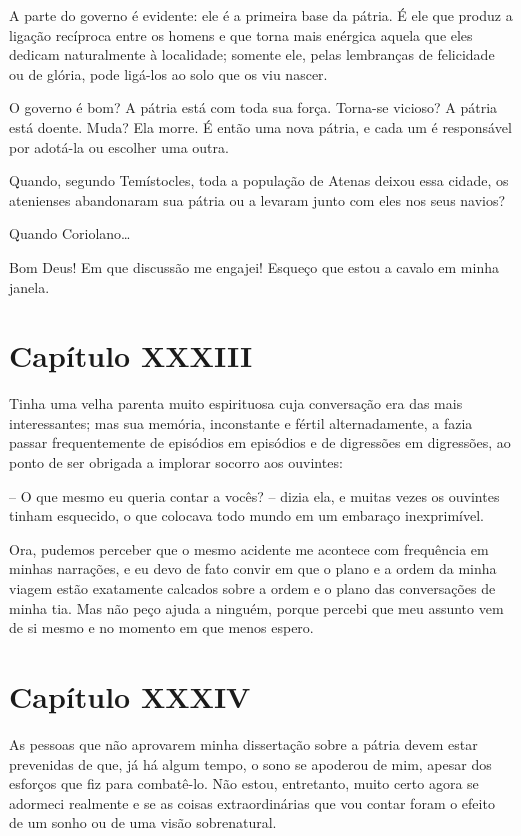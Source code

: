  A parte do governo é evidente: ele é a primeira base da pátria. É ele
que produz a ligação recíproca entre os homens e que torna mais
enérgica aquela que eles dedicam naturalmente à localidade; somente
ele, pelas lembranças de felicidade ou de glória, pode ligá-los ao solo
que os viu nascer.

 O governo é bom? A pátria está com toda sua força. Torna-se vicioso? A
pátria está doente. Muda? Ela morre. É então uma nova pátria, e cada um
é responsável por adotá-la ou escolher uma outra.

 Quando, segundo Temístocles, toda a população de Atenas deixou essa
cidade, os atenienses abandonaram sua pátria ou a levaram junto com
eles nos seus navios?

 Quando Coriolano\ldots

 Bom Deus! Em que discussão me engajei! Esqueço que estou a cavalo em
minha janela.

\section{Capítulo XXXIII}

 Tinha uma velha parenta muito espirituosa cuja conversação era das mais
interessantes; mas sua memória, inconstante e fértil alternadamente, a
fazia passar frequentemente de episódios em episódios e de digressões
em digressões, ao ponto de ser obrigada a implorar socorro aos
ouvintes:

 -- O que mesmo eu queria contar a vocês? -- dizia ela, e muitas vezes os
ouvintes tinham esquecido, o que colocava todo mundo em um embaraço
inexprimível.

 Ora, pudemos perceber que o mesmo acidente me acontece com frequência
em minhas narrações, e eu devo de fato convir em que o plano e a ordem
da minha viagem estão exatamente calcados sobre a ordem e o plano das
conversações de minha tia. Mas não peço ajuda a ninguém, porque percebi
que meu assunto vem de si mesmo e no momento em que menos espero.

\section{Capítulo XXXIV}

 As pessoas que não aprovarem minha dissertação sobre a pátria devem
estar prevenidas de que, já há algum tempo, o sono se apoderou de mim,
apesar dos esforços que fiz para combatê-lo. Não estou, entretanto,
muito certo agora se adormeci realmente e se as coisas extraordinárias
que vou contar foram o efeito de um sonho ou de uma visão sobrenatural.

